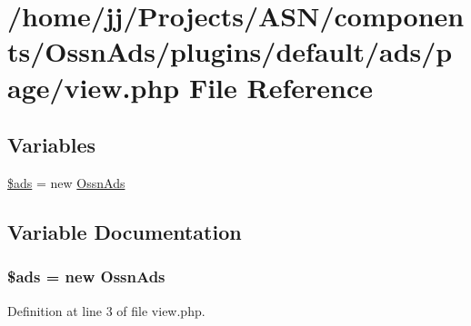 \hypertarget{components_2_ossn_ads_2plugins_2default_2ads_2page_2view_8php}{}\section{/home/jj/\+Projects/\+A\+S\+N/components/\+Ossn\+Ads/plugins/default/ads/page/view.php File Reference}
\label{components_2_ossn_ads_2plugins_2default_2ads_2page_2view_8php}
\subsection*{Variables}
\begin{DoxyCompactItemize}
\item 
\hyperlink{components_2_ossn_ads_2plugins_2default_2ads_2page_2view_8php_ad17d05c95f26062b26aadac5d2abbc73}{\$ads} = new \hyperlink{class_ossn_ads}{Ossn\+Ads}
\end{DoxyCompactItemize}


\subsection{Variable Documentation}
\subsubsection[{\texorpdfstring{\$ads}{$ads}}]{\setlength{\rightskip}{0pt plus 5cm}\$ads = new {\bf Ossn\+Ads}}\hypertarget{components_2_ossn_ads_2plugins_2default_2ads_2page_2view_8php_ad17d05c95f26062b26aadac5d2abbc73}{}\label{components_2_ossn_ads_2plugins_2default_2ads_2page_2view_8php_ad17d05c95f26062b26aadac5d2abbc73}


Definition at line 3 of file view.\+php.

